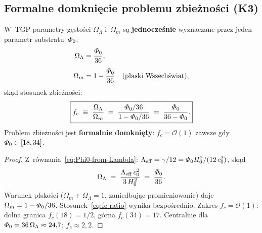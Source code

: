 \subsection{Formalne domkni\k{e}cie problemu zbie\.zno\'sci (K3)}%
\label{ssec:de-k3}

\begin{proposition}\label{prop:K3-coincidence}
W~TGP parametry g\k{e}sto\'sci $\Omega_\Lambda$ i~$\Omega_m$
s\k{a} \textbf{jednocze\'snie} wyznaczane przez jeden parametr
substratu~$\varPhi_0$:
\begin{align}
  \Omega_\Lambda
    &= \frac{\PhiZero}{36},
    \label{eq:OmLambda-from-Phi0}\\[4pt]
  \Omega_m
    &= 1 - \frac{\PhiZero}{36}
    \quad (\text{p\l{}aski Wszech\'swiat}),
    \label{eq:Omm-from-Phi0}
\end{align}
sk\k{a}d stosunek zbieżno\'sci:
\begin{equation}\label{eq:fc-ratio}
  \boxed{
    f_c \;\equiv\; \frac{\Omega_\Lambda}{\Omega_m}
    \;=\; \frac{\varPhi_0/36}{1 - \varPhi_0/36}
    \;=\; \frac{\varPhi_0}{36 - \varPhi_0}.
  }
\end{equation}
Problem zbie\.zno\'sci jest \textbf{formalnie domkni\k{e}ty}:
$f_c = \mathcal{O}(1)$ zawsze gdy $\varPhi_0 \in [18, 34]$.
\end{proposition}

\begin{proof}
Z~r\'ownania~\eqref{eq:Phi0-from-Lambda}:
$\Lambda_{\mathrm{eff}} = \gamma/12 = \varPhi_0 H_0^2/(12\,c_0^2)$,
sk\k{a}d
\[
  \Omega_\Lambda
  \;=\; \frac{\Lambda_{\mathrm{eff}}\,c_0^2}{3\,H_0^2}
  \;=\; \frac{\varPhi_0}{36}.
\]
Warunek p\l{}sko\'sci ($\Omega_m + \Omega_\Lambda = 1$,
zaniedbuj\k{a}c promieniowanie) daje
$\Omega_m = 1 - \varPhi_0/36$.
Stosunek~\eqref{eq:fc-ratio} wynika bezpo\'srednio.
Zakres $f_c = \mathcal{O}(1)$: dolna granica
$f_c(18) = 1/2$, g\'orna $f_c(34) = 17$.
Centralnie dla $\varPhi_0 = 36\,\Omega_\Lambda \approx 24{,}7$:
$f_c \approx 2{,}2$.
\end{proof}

